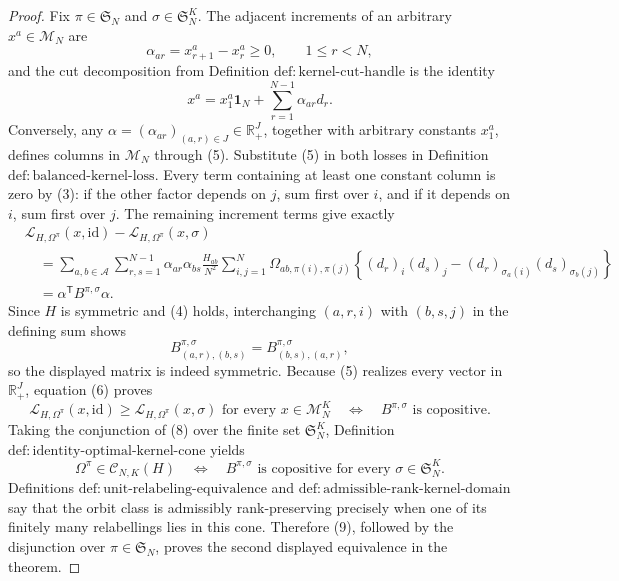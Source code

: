 \documentclass{article}
\begin{document}
\begin{proof}
Fix \(\pi\in\mathfrak S_N\) and \(\sigma\in\mathfrak S_N^K\).  The adjacent increments of an arbitrary \(x^a\in\mathcal M_N\) are
\[
 \alpha_{ar}=x^a_{r+1}-x^a_r\geq0,
 \qquad 1\leq r<N,
\]
and the cut decomposition from Definition \(\mathrm{def{:}kernel\text{-}cut\text{-}handle}\) is the identity
\[
 x^a=x_1^a\mathbf 1_N+\sum_{r=1}^{N-1}\alpha_{ar}d_r. \tag{5}
\]
Conversely, any \(\alpha=(\alpha_{ar})_{(a,r)\in J}\in\mathbb R_+^J\), together with arbitrary constants \(x_1^a\), defines columns in \(\mathcal M_N\) through (5).  Substitute (5) in both losses in Definition \(\mathrm{def{:}balanced\text{-}kernel\text{-}loss}\).  Every term containing at least one constant column is zero by (3): if the other factor depends on \(j\), sum first over \(i\), and if it depends on \(i\), sum first over \(j\).  The remaining increment terms give exactly
\[
\begin{aligned}
 &\mathscr L_{H,\Omega^\pi}(x,\mathrm{id})
 -\mathscr L_{H,\Omega^\pi}(x,\sigma)\\
 &\quad=\sum_{a,b\in\mathcal A}\sum_{r,s=1}^{N-1}
 \alpha_{ar}\alpha_{bs}\frac{H_{ab}}{N^2}
 \sum_{i,j=1}^N\Omega_{ab,\pi(i),\pi(j)}
 \left\{(d_r)_i(d_s)_j-(d_r)_{\sigma_a(i)}(d_s)_{\sigma_b(j)}\right\}\\
 &\quad=\alpha^{\mathsf T}B^{\pi,\sigma}\alpha. \tag{6}
\end{aligned}
\]
Since \(H\) is symmetric and (4) holds, interchanging \((a,r,i)\) with \((b,s,j)\) in the defining sum shows
\[
 B^{\pi,\sigma}_{(a,r),(b,s)}=B^{\pi,\sigma}_{(b,s),(a,r)}, \tag{7}
\]
so the displayed matrix is indeed symmetric.  Because (5) realizes every vector in \(\mathbb R_+^J\), equation (6) proves
\[
 \mathscr L_{H,\Omega^\pi}(x,\mathrm{id})
 \geq\mathscr L_{H,\Omega^\pi}(x,\sigma)
 \text{ for every }x\in\mathcal M_N^K
 \quad\Longleftrightarrow\quad
 B^{\pi,\sigma}\text{ is copositive}. \tag{8}
\]
Taking the conjunction of (8) over the finite set \(\mathfrak S_N^K\), Definition \(\mathrm{def{:}identity\text{-}optimal\text{-}kernel\text{-}cone}\) yields
\[
 \Omega^\pi\in\mathcal C_{N,K}(H)
 \quad\Longleftrightarrow\quad
 B^{\pi,\sigma}\text{ is copositive for every }\sigma\in\mathfrak S_N^K. \tag{9}
\]
Definitions \(\mathrm{def{:}unit\text{-}relabeling\text{-}equivalence}\) and \(\mathrm{def{:}admissible\text{-}rank\text{-}kernel\text{-}domain}\) say that the orbit class is admissibly rank-preserving precisely when one of its finitely many relabellings lies in this cone.  Therefore (9), followed by the disjunction over \(\pi\in\mathfrak S_N\), proves the second displayed equivalence in the theorem.


\end{proof}
\end{document}
